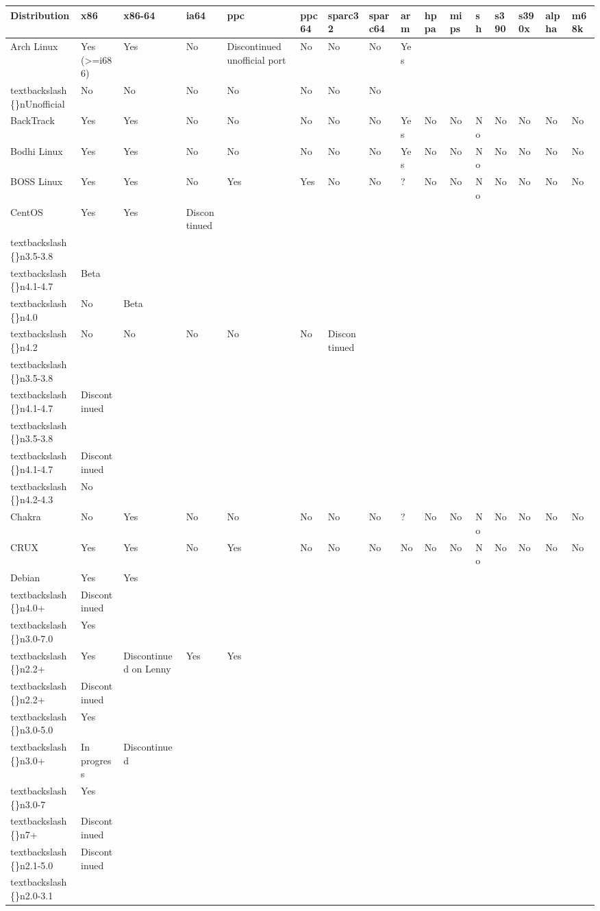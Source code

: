 \documentclass{article}
\begin{document}
\begin{tabular}{llllllllllllllll}
\toprule
Distribution & x86 & x86-64 & ia64 & ppc & ppc64 & sparc32 & sparc64 & arm & hppa & mips & sh & s390 & s390x & alpha & m68k \\
\midrule
Arch Linux & Yes (>=i686) & Yes & No & Discontinued unofficial port & No & No & No & Yes\\textbackslash\{\}nUnofficial & No & No & No & No & No & No & No \\
BackTrack & Yes & Yes & No & No & No & No & No & Yes & No & No & No & No & No & No & No \\
Bodhi Linux & Yes & Yes & No & No & No & No & No & Yes & No & No & No & No & No & No & No \\
BOSS Linux & Yes & Yes & No & Yes & Yes & No & No & ? & No & No & No & No & No & No & No \\
CentOS & Yes & Yes & Discontinued\\textbackslash\{\}n3.5-3.8\\textbackslash\{\}n4.1-4.7 & Beta\\textbackslash\{\}n4.0 & No & Beta\\textbackslash\{\}n4.2 & No & No & No & No & No & Discontinued\\textbackslash\{\}n3.5-3.8\\textbackslash\{\}n4.1-4.7 & Discontinued\\textbackslash\{\}n3.5-3.8\\textbackslash\{\}n4.1-4.7 & Discontinued\\textbackslash\{\}n4.2-4.3 & No \\
Chakra & No & Yes & No & No & No & No & No & ? & No & No & No & No & No & No & No \\
CRUX & Yes & Yes & No & Yes & No & No & No & No & No & No & No & No & No & No & No \\
Debian & Yes & Yes\\textbackslash\{\}n4.0+ & Discontinued\\textbackslash\{\}n3.0-7.0 & Yes\\textbackslash\{\}n2.2+ & Yes & Discontinued on Lenny & Yes & Yes\\textbackslash\{\}n2.2+ & Discontinued\\textbackslash\{\}n3.0-5.0 & Yes\\textbackslash\{\}n3.0+ & In progress & Discontinued\\textbackslash\{\}n3.0-7 & Yes\\textbackslash\{\}n7+ & Discontinued\\textbackslash\{\}n2.1-5.0 & Discontinued\\textbackslash\{\}n2.0-3.1 \\

\end{tabular}
\end{document}
